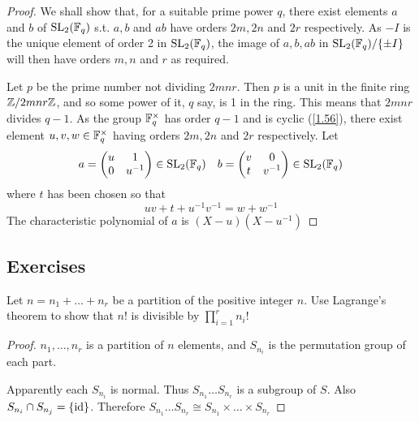 \documentclass[11pt]{article}
\begin{document}
\begin{proof}
We shall show that, for a suitable prime power \(q\), there exist elements \(a\) and \(b\)
of \(\operatorname{SL}_2(\mathbb{F}_q)\) s.t. \(a,b\) and \(ab\) have orders \(2m,2n\) and \(2r\) respectively.
As \(-I\) is the unique element of order 2 in \(\operatorname{SL}_2(\mathbb{F}_q)\), the image of \(a,b,ab\)
in \(\operatorname{SL}_2(\mathbb{F}_q)/\{\pm I\}\) will then have orders \(m,n\) and \(r\) as required.

Let \(p\) be the prime number not dividing \(2mnr\). Then \(p\) is a unit in the finite
ring \(\mathbb{Z}/2mnr\mathbb{Z}\), and so some power of it, \(q\) say, is 1 in the ring. This means that \(2mnr\)
divides \(q-1\). As the group \(\mathbb{F}_q^\times\) has order \(q-1\) and is cyclic (\ref{1.56}), there exist
element \(u,v,w\in\mathbb{F}_q^{\times}\) having orders \(2m,2n\) and \(2r\) respectively. Let
\begin{equation*}
a=
\begin{pmatrix}
u&1\\0&u^{-1}
\end{pmatrix}\in\operatorname{SL}_2(\mathbb{F}_q)\quad b=
\begin{pmatrix}
v&0\\t&v^{-1}
\end{pmatrix}\in\operatorname{SL}_2(\mathbb{F}_q)
\end{equation*}
where \(t\) has been chosen so that
\begin{equation*}
uv+t+u^{-1}v^{-1}=w+w^{-1}
\end{equation*}
The characteristic polynomial of \(a\) is \((X-u)(X-u^{-1})\)
\end{proof}

\label{SKIP}
\subsection{Exercises}
\label{sec:org723ed62}
\begin{exercise}
\label{ex1.4}
Let \(n=n_1+\dots+n_r\) be a partition of the positive integer \(n\). Use Lagrange's theorem to show
that \(n!\) is divisible by \(\prod_{i=1}^rn_i!\)
\end{exercise}

\begin{proof}
\(n_1,\dots,n_r\) is a partition of \(n\) elements, and \(S_{n_i}\) is the permutation group of each
part.

Apparently each \(S_{n_i}\) is normal. Thus \(S_{n_1}\dots S_{n_r}\) is a subgroup of \(S\).
Also \(S_{n_i}\cap S_{n_j}=\{\operatorname{id}\}\). Therefore \(S_{n_1}\dots S_{n_r}\cong S_{n_1}\times\dots\times S_{n_r}\)
\end{proof}
\end{document}
